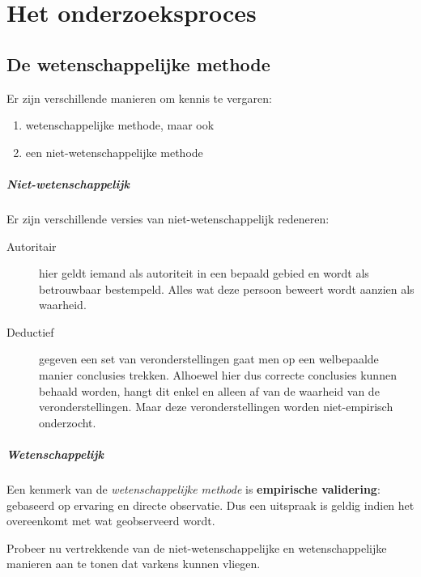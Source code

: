 \chapter{Het onderzoeksproces}
\label{ch:onderzoeksproces}

\section{De wetenschappelijke methode}

Er zijn verschillende manieren om kennis te vergaren:

\begin{enumerate}
	\item wetenschappelijke methode, maar ook 
	\item een niet-wetenschappelijke methode
\end{enumerate}

\paragraph{Niet-wetenschappelijk}Er zijn verschillende versies van niet-wetenschappelijk redeneren: 
\begin{description}
	\item [Autoritair] hier geldt iemand als autoriteit in een bepaald gebied en wordt als betrouwbaar bestempeld. Alles wat deze persoon beweert wordt aanzien als waarheid. 
	\item [Deductief] gegeven een set van veronderstellingen gaat men op een welbepaalde manier conclusies trekken. Alhoewel hier dus correcte conclusies kunnen behaald worden, hangt dit enkel en alleen af van de waarheid van de veronderstellingen. Maar deze veronderstellingen worden niet-empirisch onderzocht.
\end{description}

\paragraph{Wetenschappelijk}
Een kenmerk van de \textsl{wetenschappelijke methode} is \textbf{empirische validering}: gebaseerd op ervaring en directe observatie. Dus een uitspraak is geldig indien het overeenkomt met wat geobserveerd wordt.

\begin{exercise}
Probeer nu vertrekkende van de niet-wetenschappelijke en wetenschappelijke manieren aan te tonen dat varkens kunnen vliegen. 
\end{exercise}

